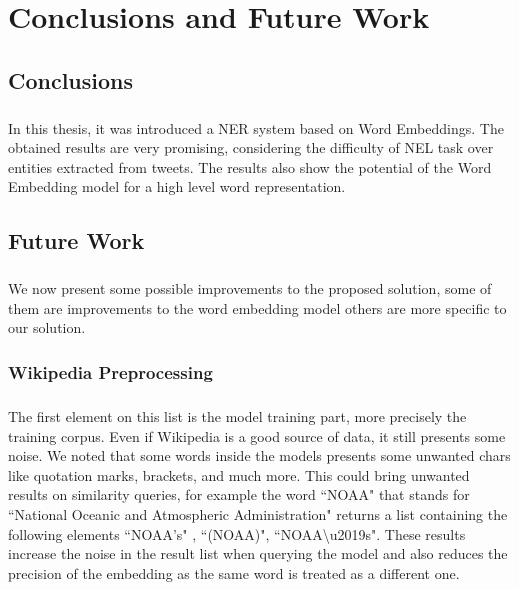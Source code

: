 \chapter{Conclusions and Future Work}

\section{Conclusions}
\paragraph{}
In this thesis, it was introduced a NER system based on Word Embeddings. The obtained results are very promising, considering the difficulty of NEL task over entities extracted from tweets. The results also show the potential of the Word Embedding model for a high level word representation.

\section{Future Work}
\paragraph{}
We now present some possible improvements to the proposed solution, some of them are improvements to the word embedding model others are more specific to our solution.

\subsection{Wikipedia Preprocessing}
\paragraph{}
The first element on this list is the model training part, more precisely the training corpus. Even if Wikipedia is a good source of data, it still presents some noise. We noted that some words inside the models presents some unwanted chars like quotation marks, brackets, and much more. This could bring unwanted results on similarity queries, for example the word ``NOAA"  that stands for ``National Oceanic and Atmospheric Administration" returns a list containing the following elements ``NOAA's" , ``(NOAA)",  \mbox{``NOAA\textbackslash u2019s"}. These results increase the noise in the result list when querying the model and also reduces the precision of the embedding as the same word is treated as a different one.


